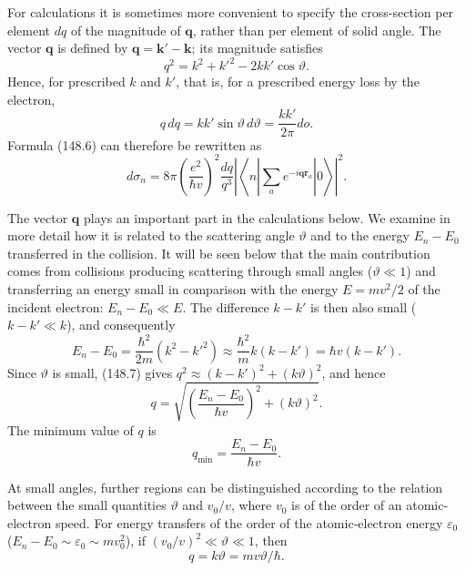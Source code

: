 

For calculations it is sometimes more convenient to specify the cross-section per element $dq$ of the magnitude of $\mathbf q$, rather than per element of solid angle. The vector $\mathbf q$ is defined by $\mathbf q=\mathbf k'-\mathbf k$; its magnitude satisfies
\begin{equation}
 q^2=k^2+k'^2-2kk'\cos\vartheta.
 \tag{148.7}
\end{equation}
Hence, for prescribed $k$ and $k'$, that is, for a prescribed energy loss by the electron,
\begin{equation}
 q\,dq=kk'\sin\vartheta\,d\vartheta=\frac{kk'}{2\pi}do.
 \tag{148.8}
\end{equation}
Formula (148.6) can therefore be rewritten as
\begin{equation}
 d\sigma_n=8\pi\left(\frac{e^2}{\hbar v}\right)^2\frac{dq}{q^3}
 \left|\left\langle n\left|\sum_a e^{-i\mathbf q\mathbf r_a}\right|0\right\rangle\right|^2.
 \tag{148.9}
\end{equation}

The vector $\mathbf q$ plays an important part in the calculations below. We examine in more detail how it is related to the scattering angle $\vartheta$ and to the energy $E_n-E_0$ transferred in the collision. It will be seen below that the main contribution comes from collisions producing scattering through small angles ($\vartheta\ll1$) and transferring an energy small in comparison with the energy $E=mv^2/2$ of the incident electron: $E_n-E_0\ll E$. The difference $k-k'$ is then also small ($k-k'\ll k$), and consequently
\[
 E_n-E_0=\frac{\hbar^2}{2m}(k^2-k'^2)\approx\frac{\hbar^2}{m}k(k-k')=\hbar v(k-k').
\]
Since $\vartheta$ is small, (148.7) gives $q^2\approx(k-k')^2+(k\vartheta)^2$, and hence
\begin{equation}
 q=\sqrt{\left(\frac{E_n-E_0}{\hbar v}\right)^2+(k\vartheta)^2}.
 \tag{148.10}
\end{equation}
The minimum value of $q$ is
\begin{equation}
 q_{\min}=\frac{E_n-E_0}{\hbar v}.
 \tag{148.11}
\end{equation}

At small angles, further regions can be distinguished according to the relation between the small quantities $\vartheta$ and $v_0/v$, where $v_0$ is of the order of an atomic-electron speed. For energy transfers of the order of the atomic-electron energy $\varepsilon_0$ ($E_n-E_0\sim\varepsilon_0\sim mv_0^2$), if $(v_0/v)^2\ll\vartheta\ll1$, then
\begin{equation}
 q=k\vartheta=mv\vartheta/\hbar.
 \tag{148.12}
\end{equation}
